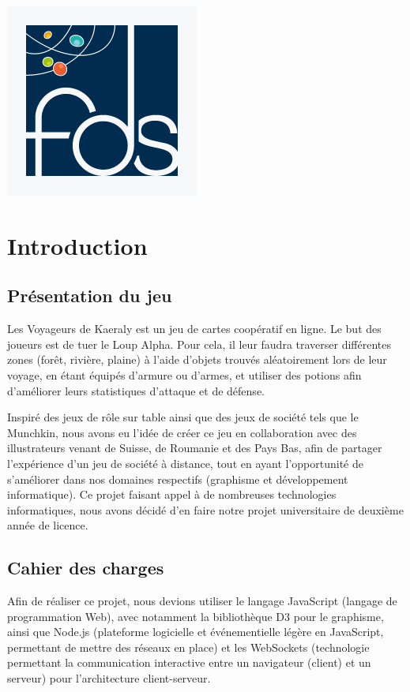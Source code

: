 \documentclass[12pt]{report}
\begin{document}
\begin{titlepage}
\begin{center}
			\vfill

			\includegraphics[scale=0.3]{logo-fds.jpg}~

		\end{center}

	\end{titlepage}

	\tableofcontents

	\chapter*{Introduction}

		\section*{Présentation du jeu}
  	Les Voyageurs de Kaeraly est un jeu de cartes coopératif en ligne. Le but des joueurs est de tuer le Loup Alpha. Pour cela, il leur faudra traverser différentes zones (forêt, rivière, plaine) à l'aide d'objets trouvés aléatoirement lors de leur voyage, en étant équipés d'armure ou d'armes, et utiliser des potions afin d'améliorer leurs statistiques d'attaque et de défense.

  	Inspiré des jeux de rôle sur table ainsi que des jeux de société tels que le Munchkin, nous avons eu l'idée de créer ce jeu en collaboration avec des illustrateurs venant de Suisse, de Roumanie et des Pays Bas, afin de partager l'expérience d'un jeu de société à distance, tout en ayant l'opportunité de s'améliorer dans nos domaines respectifs (graphisme et développement informatique). Ce projet faisant appel à de nombreuses technologies informatiques, nous avons décidé d'en faire notre projet universitaire de deuxième année de licence.

  	\section*{Cahier des charges}
  	Afin de réaliser ce projet, nous devions utiliser le langage JavaScript (langage de programmation Web), avec notamment la bibliothèque D3 pour le graphisme, ainsi que Node.js (plateforme logicielle et événementielle légère en JavaScript, permettant de mettre des réseaux en place) et les WebSockets (technologie permettant la communication interactive entre un navigateur (client) et un serveur) pour l'architecture client-serveur.
\end{document}
